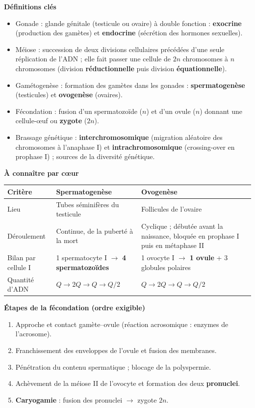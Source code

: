 \documentclass[11pt]{article}
\newcommand{\cle}[1]{{\popxbold\color{popdark}#1}}
\begin{document}
\begin{bilan}
\textbf{Définitions clés}
\begin{itemize}
  \item \cle{Gonade} : glande génitale (testicule ou ovaire) à double fonction : \textbf{exocrine} (production des gamètes) et \textbf{endocrine} (sécrétion des hormones sexuelles).
  \item \cle{Méiose} : succession de deux divisions cellulaires précédées d'une seule réplication de l'ADN ; elle fait passer une cellule de $2n$ chromosomes à $n$ chromosomes (division \textbf{réductionnelle} puis division \textbf{équationnelle}).
  \item \cle{Gamétogenèse} : formation des gamètes dans les gonades : \textbf{spermatogenèse} (testicules) et \textbf{ovogenèse} (ovaires).
  \item \cle{Fécondation} : fusion d'un spermatozoïde ($n$) et d'un ovule ($n$) donnant une cellule-\oe uf ou \textbf{zygote} ($2n$).
  \item \cle{Brassage génétique} : \textbf{interchromosomique} (migration aléatoire des chromosomes à l'anaphase I) et \textbf{intrachromosomique} (crossing-over en prophase I) ; sources de la diversité génétique.
\end{itemize}

\textbf{À connaître par c\oe ur}
\begin{center}
\begin{tabularx}{\linewidth}{|l|X|X|}
\hline
\rowcolor{popblueL} \textbf{Critère} & \textbf{Spermatogenèse} & \textbf{Ovogenèse} \\
\hline
Lieu & Tubes séminifères du testicule & Follicules de l'ovaire \\
\hline
Déroulement & Continue, de la puberté à la mort & Cyclique ; débutée avant la naissance, bloquée en prophase I puis en métaphase II \\
\hline
Bilan par cellule I & 1 spermatocyte I $\to$ \textbf{4 spermatozoïdes} & 1 ovocyte I $\to$ \textbf{1 ovule} + 3 globules polaires \\
\hline
Quantité d'ADN & $Q \to 2Q \to Q \to Q/2$ & $Q \to 2Q \to Q \to Q/2$ \\
\hline
\end{tabularx}
\end{center}

\textbf{Étapes de la fécondation (ordre exigible)}
\begin{enumerate}
  \item Approche et contact gamète--ovule (réaction acrosomique : enzymes de l'acrosome).
  \item Franchissement des enveloppes de l'ovule et fusion des membranes.
  \item Pénétration du contenu spermatique ; blocage de la polyspermie.
  \item Achèvement de la méiose II de l'ovocyte et formation des deux \textbf{pronuclei}.
  \item \textbf{Caryogamie} : fusion des pronuclei $\to$ zygote $2n$.
\end{enumerate}


\end{bilan}
\end{document}
